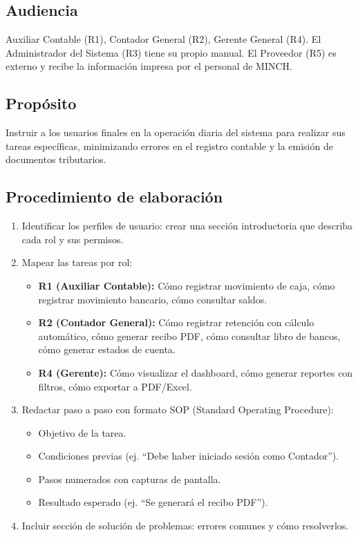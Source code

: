 \documentclass[stu]{apa7}
\begin{document}
\subsection{Audiencia}

Auxiliar Contable (R1), Contador General (R2), Gerente General (R4). El Administrador del Sistema (R3) tiene su propio manual. El Proveedor (R5) es externo y recibe la información impresa por el personal de MINCH.

\subsection{Propósito}

Instruir a los usuarios finales en la operación diaria del sistema para realizar sus tareas específicas, minimizando errores en el registro contable y la emisión de documentos tributarios.

\subsection{Procedimiento de elaboración}

\begin{enumerate}
    \item Identificar los perfiles de usuario: crear una sección introductoria que describa cada rol y sus permisos.
    \item Mapear las tareas por rol:
    \begin{itemize}
        \item \textbf{R1 (Auxiliar Contable):} Cómo registrar movimiento de caja, cómo registrar movimiento bancario, cómo consultar saldos.
        \item \textbf{R2 (Contador General):} Cómo registrar retención con cálculo automático, cómo generar recibo PDF, cómo consultar libro de bancos, cómo generar estados de cuenta.
        \item \textbf{R4 (Gerente):} Cómo visualizar el dashboard, cómo generar reportes con filtros, cómo exportar a PDF/Excel.
    \end{itemize}
    \item Redactar paso a paso con formato SOP (Standard Operating Procedure):
    \begin{itemize}
        \item Objetivo de la tarea.
        \item Condiciones previas (ej. ``Debe haber iniciado sesión como Contador'').
        \item Pasos numerados con capturas de pantalla.
        \item Resultado esperado (ej. ``Se generará el recibo PDF'').
    \end{itemize}
    \item Incluir sección de solución de problemas: errores comunes y cómo resolverlos.
\end{enumerate}
\end{document}
